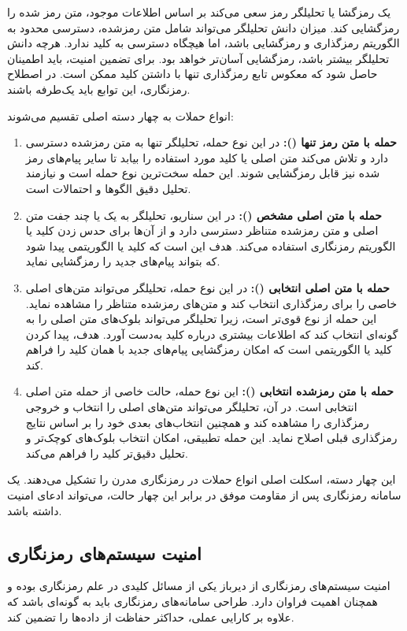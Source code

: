 یک رمزگشا یا تحلیلگر رمز سعی می‌کند بر اساس اطلاعات موجود، متن رمز شده را رمزگشایی کند. میزان دانش تحلیلگر می‌تواند شامل متن رمزشده، دسترسی محدود به الگوریتم رمزگذاری و رمزگشایی باشد، اما هیچگاه دسترسی به کلید ندارد. هرچه دانش تحلیلگر بیشتر باشد، رمزگشایی آسان‌تر خواهد بود. برای تضمین امنیت، باید اطمینان حاصل شود که معکوس تابع رمزگذاری تنها با داشتن کلید ممکن است. در اصطلاح رمزنگاری، این توابع باید یک‌طرفه باشند.

انواع حملات به چهار دسته اصلی تقسیم می‌شوند:

\begin{enumerate}
    \item \textbf{حمله با متن رمز تنها ():} در این نوع حمله، تحلیلگر تنها به متن رمزشده دسترسی دارد و تلاش می‌کند متن اصلی یا کلید مورد استفاده را بیابد تا سایر پیام‌های رمز شده نیز قابل رمزگشایی شوند. این حمله سخت‌ترین نوع حمله است و نیازمند تحلیل دقیق الگوها و احتمالات است\cite{ref35}.
    \item \textbf{حمله با متن اصلی مشخص ():} در این سناریو، تحلیلگر به یک یا چند جفت متن اصلی و متن رمزشده متناظر دسترسی دارد و از آن‌ها برای حدس زدن کلید یا الگوریتم رمزنگاری استفاده می‌کند. هدف این است که کلید  یا الگوریتمی پیدا شود که بتواند پیام‌های جدید را رمزگشایی نماید.
    \item \textbf{حمله با متن اصلی انتخابی ():} در این نوع حمله، تحلیلگر می‌تواند متن‌های اصلی خاصی را برای رمزگذاری انتخاب کند و متن‌های رمزشده متناظر را مشاهده نماید. این حمله از نوع  قوی‌تر است، زیرا تحلیلگر می‌تواند بلوک‌های متن اصلی را به گونه‌ای انتخاب کند که اطلاعات بیشتری درباره کلید به‌دست آورد. هدف، پیدا کردن کلید  یا الگوریتمی است که امکان رمزگشایی پیام‌های جدید با همان کلید را فراهم کند.
    \item \textbf{حمله با متن رمزشده انتخابی ():} این نوع حمله، حالت خاصی از حمله متن اصلی انتخابی است. در آن، تحلیلگر می‌تواند متن‌های اصلی را انتخاب و خروجی رمزگذاری را مشاهده کند و همچنین انتخاب‌های بعدی خود را بر اساس نتایج رمزگذاری قبلی اصلاح نماید. این حمله تطبیقی، امکان انتخاب بلوک‌های کوچک‌تر و تحلیل دقیق‌تر کلید را فراهم می‌کند.
\end{enumerate}

این چهار دسته، اسکلت اصلی انواع حملات در رمزنگاری مدرن را تشکیل می‌دهند. یک سامانه رمزنگاری پس از مقاومت موفق در برابر این چهار حالت، می‌تواند ادعای امنیت داشته باشد\cite{ref36}.

\subsection{امنیت سیستم‌های رمزنگاری}
امنیت سیستم‌های رمزنگاری از دیرباز یکی از مسائل کلیدی در علم رمزنگاری بوده و همچنان اهمیت فراوان دارد. طراحی سامانه‌های رمزنگاری باید به گونه‌ای باشد که علاوه بر کارایی عملی، حداکثر حفاظت از داده‌ها را تضمین کند.

